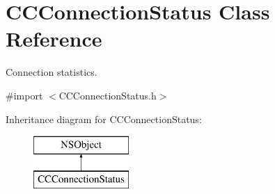 \hypertarget{interface_c_c_connection_status}{}\section{C\+C\+Connection\+Status Class Reference}
\label{interface_c_c_connection_status}


Connection statistics.  




{\ttfamily \#import $<$C\+C\+Connection\+Status.\+h$>$}

Inheritance diagram for C\+C\+Connection\+Status\+:\begin{figure}[H]
\begin{center}
\leavevmode
\includegraphics[height=2.000000cm]{interface_c_c_connection_status}
\end{center}
\end{figure}
